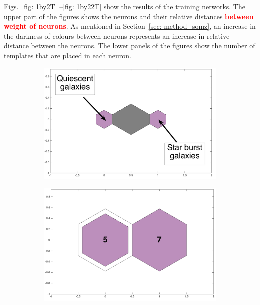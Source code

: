             Figs.~\ref{fig: 1by2T} --\ref{fig: 1by22T} show the results of the training networks.  %
            The upper part of the figures shows the neurons and their relative distances \textbf{\textcolor{red}{between weight of neurons}}.
            As mentioned in Section~\ref{sec: method_somz}, an increase in the darkness of colours between neurons represents an increase in relative distance between the neurons.
            The lower panels of the figures show the number of  templates that are placed in each neuron. 
            \begin{figure}
                \begin{subfigure}[b]{0.45\textwidth}
                    \centering
                  \includegraphics[width=\textwidth]{images0.01/1d/dist_1_by_2.png}
                \end{subfigure}
                \hfill
                \begin{subfigure}[b]{0.45\textwidth}
                    \centering \includegraphics[width=\textwidth]{images0.01/1d/hit_t_1_by_2.png}

\end{subfigure}
\end{figure}
